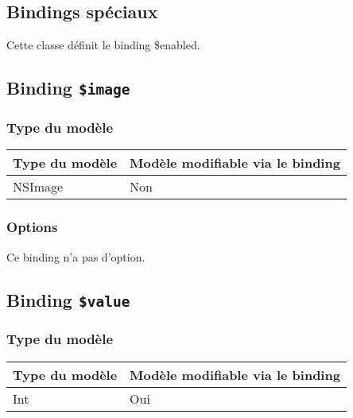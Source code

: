 
\subsection{Bindings spéciaux}

Cette classe définit le binding \$enabled.

\subsection{Binding \texttt{\$image}}

\subsubsection{Type du modèle}

\begin{tabular}{|l|l|}
\hline
\textbf{Type du modèle} & \textbf{Modèle modifiable via le binding}\\
\hline
NSImage & Non\\
\hline
\end{tabular}
\subsubsection{Options}

Ce binding n'a pas d'option.









\subsection{Binding \texttt{\$value}}

\subsubsection{Type du modèle}

\begin{tabular}{|l|l|}
\hline
\textbf{Type du modèle} & \textbf{Modèle modifiable via le binding}\\
\hline
Int & Oui\\
\hline
\end{tabular}
